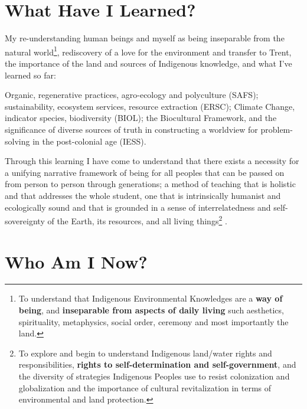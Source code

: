 \documentclass{report}
\begin{document}
\section{What Have I Learned?}

My re-understanding human beings and myself as being inseparable from the natural world\footnote{To understand that Indigenous Environmental Knowledges are a \textbf{way of being}, and \textbf{inseparable from aspects of daily living} such aesthetics, spirituality, metaphysics, social order, ceremony and most importantly the land.}, rediscovery of a love for the environment and transfer to Trent, the importance of the land and sources of Indigenous knowledge, and what I've learned so far:

Organic, regenerative practices, agro-ecology and polyculture (SAFS); sustainability, ecosystem services, resource extraction (ERSC); Climate Change, indicator species, biodiversity (BIOL); the Biocultural Framework, and the significance of diverse sources of truth in constructing a worldview for problem-solving in the post-colonial age (IESS).

Through this learning I have come to understand that there exists a necessity for a unifying narrative framework of being for all peoples that can be passed on from person to person through generations; a method of teaching that is holistic and that addresses the whole student, one that is intrinsically humanist and ecologically sound and that is grounded in a sense of interrelatedness and self-sovereignty of the Earth, its resources, and all living things\footnote{To explore and begin to understand Indigenous land/water rights and responsibilities, \textbf{rights to self-determination and self-government}, and the diversity of strategies Indigenous Peoples use to resist colonization and globalization and the importance of cultural revitalization in terms of environmental and land protection.} \parencite{holistic}.

\section{Who Am I Now?}
\end{document}
